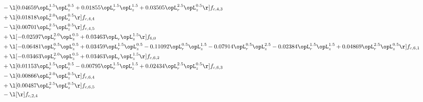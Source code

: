 \begin{alignat}{2}
& - \l[  0.04659 \opL_r^{1.5} \opL_z^{0.5} +  0.01855 \opL_r^{1.5} \opL_z^{1.5} +  0.03505 \opL_r^{2.5} \opL_z^{0.5}  \r] f_{c,4,3} \nonumber \\ 
& + \l[  0.01818 \opL_r^{2.0} \opL_z^{0.5}  \r] f_{c,4,4} \nonumber \\ 
& - \l[  0.00701 \opL_r^{2.5} \opL_z^{0.5}  \r] f_{c,4,5} \nonumber \\ 
& + \l[  -0.02597 \opL_r^{2.0} \opL_z^{0.5} +  0.03463 \opL_r \opL_z^{1.5}  \r] f_{6,0} \nonumber \\ 
& + \l[  -0.06481 \opL_r^{0.5} \opL_z^{0.5} +  0.03459 \opL_r^{1.5} \opL_z^{0.5}   -0.11092 \opL_r^{0.5} \opL_z^{1.5}   -0.07914 \opL_r^{0.5} \opL_z^{2.5}   -0.02384 \opL_r^{1.5} \opL_z^{1.5} +  0.04869 \opL_r^{2.5} \opL_z^{0.5}  \r] f_{c,6,1} \nonumber \\ 
& + \l[  -0.03463 \opL_r^{2.0} \opL_z^{0.5} +  0.03463 \opL_r \opL_z^{1.5}  \r] f_{c,6,2} \nonumber \\ 
& + \l[  0.01153 \opL_r^{1.5} \opL_z^{0.5}   -0.00795 \opL_r^{1.5} \opL_z^{1.5} +  0.02434 \opL_r^{2.5} \opL_z^{0.5}  \r] f_{c,6,3} \nonumber \\ 
& - \l[  0.00866 \opL_r^{2.0} \opL_z^{0.5}  \r] f_{c,6,4} \nonumber \\ 
& + \l[  0.00487 \opL_r^{2.5} \opL_z^{0.5}  \r] f_{c,6,5} \nonumber \\ 
& - \l[  \r] f_{c,2,4} \nonumber \\ 
\end{alignat} 


